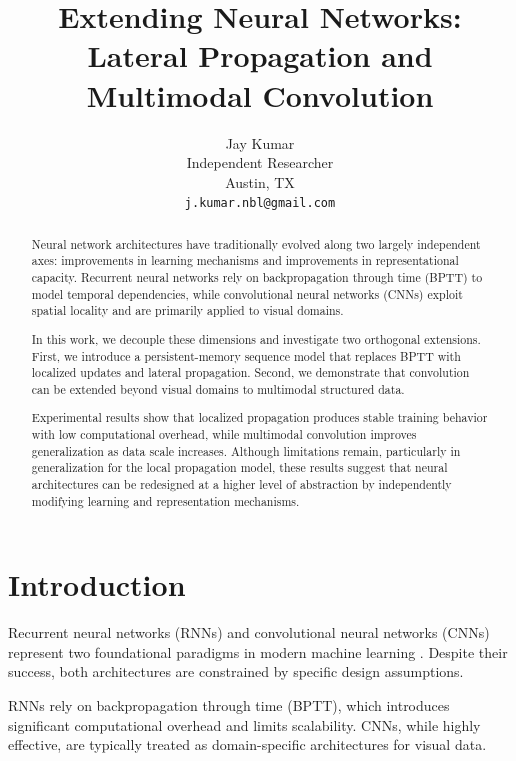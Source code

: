 \documentclass{article}
\title{Extending Neural Networks: Lateral Propagation and Multimodal Convolution}
\author{
	Jay Kumar \\
	Independent Researcher \\
	Austin, TX \\
	\texttt{j.kumar.nbl@gmail.com}
}
\begin{document}
	
	\maketitle
	
	\begin{abstract}
		Neural network architectures have traditionally evolved along two largely independent axes: improvements in learning mechanisms and improvements in representational capacity. Recurrent neural networks rely on backpropagation through time (BPTT) to model temporal dependencies, while convolutional neural networks (CNNs) exploit spatial locality and are primarily applied to visual domains.
		
		In this work, we decouple these dimensions and investigate two orthogonal extensions. First, we introduce a persistent-memory sequence model that replaces BPTT with localized updates and lateral propagation. Second, we demonstrate that convolution can be extended beyond visual domains to multimodal structured data.
		
		Experimental results show that localized propagation produces stable training behavior with low computational overhead, while multimodal convolution improves generalization as data scale increases. Although limitations remain, particularly in generalization for the local propagation model, these results suggest that neural architectures can be redesigned at a higher level of abstraction by independently modifying learning and representation mechanisms.
	\end{abstract}
	
	
	\section{Introduction}
	
	Recurrent neural networks (RNNs) and convolutional neural networks (CNNs) represent two foundational paradigms in modern machine learning \cite{goodfellow2016deep, lecun1998gradient}. Despite their success, both architectures are constrained by specific design assumptions.
	
	RNNs rely on backpropagation through time (BPTT), which introduces significant computational overhead and limits scalability. CNNs, while highly effective, are typically treated as domain-specific architectures for visual data.
	
\end{document}
